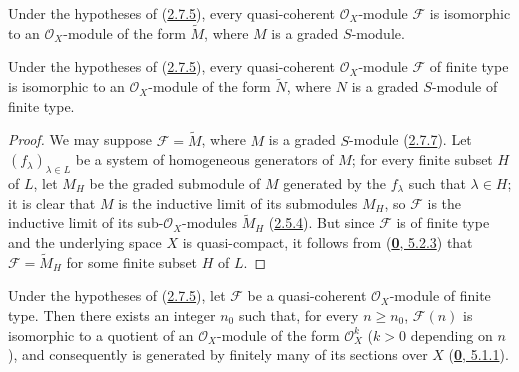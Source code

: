 \begin{corollary}[2.7.7]
\label{II.2.7.7}
Under the hypotheses of \textup{(\hyperref[II.2.7.5]{2.7.5})}, every
quasi-coherent $\mathcal{O}_X$-module $\mathcal{F}$ is isomorphic to an
$\mathcal{O}_X$-module of the form $\widetilde{M}$, where $M$ is a graded
$S$-module.
\end{corollary}

\begin{corollary}[2.7.8]
\label{II.2.7.8}
Under the hypotheses of \textup{(\hyperref[II.2.7.5]{2.7.5})}, every
quasi-coherent $\mathcal{O}_X$-module $\mathcal{F}$ of finite type is
isomorphic to an $\mathcal{O}_X$-module of the form $\widetilde{N}$, where $N$
is a graded $S$-module of finite type.
\end{corollary}

\begin{proof}
We may suppose $\mathcal{F}=\widetilde{M}$, where $M$ is a graded $S$-module
(\hyperref[II.2.7.7]{2.7.7}). Let $(f_\lambda)_{\lambda\in L}$ be a
system of homogeneous generators of $M$; for every finite subset $H$ of $L$,
let $M_H$ be the graded submodule of $M$ generated by the $f_\lambda$ such
that $\lambda\in H$; it is clear that $M$ is the inductive limit of its
submodules $M_H$, so $\mathcal{F}$ is the inductive limit of its
sub-$\mathcal{O}_X$-modules $\widetilde{M}_H$ (\hyperref[II.2.5.4]{2.5.4}).
But since $\mathcal{F}$ is of finite type and the underlying space $X$ is
quasi-compact, it follows from (\hyperref[0.5.2.3]{\textbf{0}, 5.2.3}) that
$\mathcal{F}=\widetilde{M}_H$ for some finite subset $H$ of $L$.
\end{proof}

\begin{corollary}[2.7.9]
\label{II.2.7.9}
Under the hypotheses of \textup{(\hyperref[II.2.7.5]{2.7.5})}, let $\mathcal{F}$ be
a quasi-coherent $\mathcal{O}_X$-module of finite type. Then there exists an
integer $n_0$ such that, for every $n\geq n_0$, $\mathcal{F}(n)$ is isomorphic
to a quotient of an $\mathcal{O}_X$-module of the form $\mathcal{O}_X^k$ ($k>0$
depending on $n$), and consequently is generated by finitely many of its
sections over $X$ \textup{(\hyperref[0.5.1.1]{\textbf{0}, 5.1.1})}.
\end{corollary}

